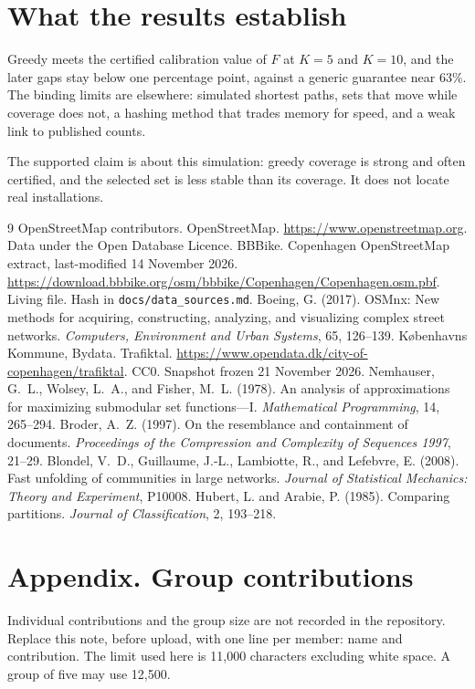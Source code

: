 \documentclass[11pt,a4paper]{article}
\begin{document}
\section{What the results establish}

Greedy meets the certified calibration value of \(F\) at \(K=5\) and \(K=10\), and the later gaps stay below one percentage point, against a generic guarantee near 63\%. The binding limits are elsewhere: simulated shortest paths, sets that move while coverage does not, a hashing method that trades memory for speed, and a weak link to published counts.

The supported claim is about this simulation: greedy coverage is strong and often certified, and the selected set is less stable than its coverage. It does not locate real installations.

\begin{thebibliography}{9}
 OpenStreetMap contributors. OpenStreetMap. \url{https://www.openstreetmap.org}. Data under the Open Database Licence.
 BBBike. Copenhagen OpenStreetMap extract, last-modified 14 November 2026. \url{https://download.bbbike.org/osm/bbbike/Copenhagen/Copenhagen.osm.pbf}. Living file. Hash in \texttt{docs/data\_sources.md}.
 Boeing, G. (2017). OSMnx: New methods for acquiring, constructing, analyzing, and visualizing complex street networks. \emph{Computers, Environment and Urban Systems}, 65, 126--139.
 Københavns Kommune, Bydata. Trafiktal. \url{https://www.opendata.dk/city-of-copenhagen/trafiktal}. CC0. Snapshot frozen 21 November 2026.
 Nemhauser, G.~L., Wolsey, L.~A., and Fisher, M.~L. (1978). An analysis of approximations for maximizing submodular set functions---I. \emph{Mathematical Programming}, 14, 265--294.
 Broder, A.~Z. (1997). On the resemblance and containment of documents. \emph{Proceedings of the Compression and Complexity of Sequences 1997}, 21--29.
 Blondel, V.~D., Guillaume, J.-L., Lambiotte, R., and Lefebvre, E. (2008). Fast unfolding of communities in large networks. \emph{Journal of Statistical Mechanics: Theory and Experiment}, P10008.
 Hubert, L. and Arabie, P. (1985). Comparing partitions. \emph{Journal of Classification}, 2, 193--218.
\end{thebibliography}

\section*{Appendix. Group contributions}
Individual contributions and the group size are not recorded in the repository. Replace this note, before upload, with one line per member: name and contribution. The limit used here is 11{,}000 characters excluding white space. A group of five may use 12{,}500.
\end{document}
